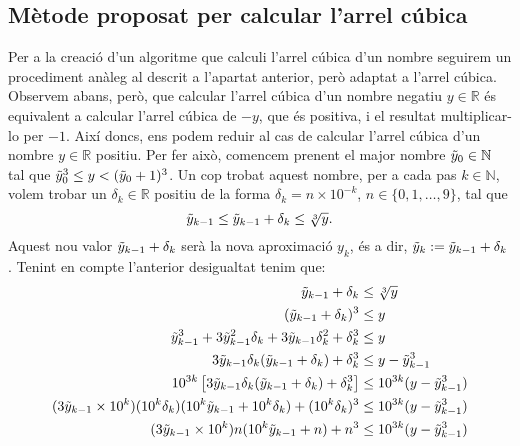 \documentclass[11pt,a4paper]{article}
\theoremstyle{definition}
\begin{document}
\subsection{Mètode proposat per calcular l'arrel cúbica}
Per a la creació d'un algoritme que calculi l'arrel cúbica d'un nombre seguirem un procediment anàleg al descrit a l'apartat anterior, però adaptat a l'arrel cúbica. Observem abans, però, que calcular l'arrel cúbica d'un nombre negatiu $y\in\mathbb{R}$ és equivalent a calcular l'arrel cúbica de $-y$, que és positiva, i el resultat multiplicar-lo per $-1$. Així doncs, ens podem reduir al cas de calcular l'arrel cúbica d'un nombre $y\in\mathbb{R}$ positiu. Per fer això, comencem prenent el major nombre $\Tilde{y}_0\in\mathbb{N}$ tal que $\Tilde{y}_0^3\leq y<(\Tilde{y}_0+1)^3$. Un cop trobat aquest nombre, per a cada pas $k\in\mathbb{N}$, volem trobar un $\delta_k\in\mathbb{R}$ positiu de la forma $\delta_k=n\times10^{-k}$, $n\in\{0,1,\ldots,9\}$, tal que $$\Tilde{y}_{k-1}\leq\Tilde{y}_{k-1}+\delta_k\leq\sqrt[3]{y}.$$ Aquest nou valor $\Tilde{y}_{k-1}+\delta_k$ serà la nova aproximació $y_k$, és a dir, $\Tilde{y}_k:=\Tilde{y}_{k-1}+\delta_k$. Tenint en compte l'anterior desigualtat tenim que:
\begin{align*}
    \Tilde{y}_{k-1}+\delta_k                                                                      & \leq\sqrt[3]{y}                   \\
    (\Tilde{y}_{k-1}+\delta_k)^3                                                                  & \leq y                            \\
    \Tilde{y}_{k-1}^3+3\Tilde{y}_{k-1}^2\delta_k+3\Tilde{y}_{k-1}\delta_k^2+\delta_k^3            & \leq y                            \\
    3\Tilde{y}_{k-1}\delta_k(\Tilde{y}_{k-1}+\delta_k)+\delta_k^3                                 & \leq y-\Tilde{y}_{k-1}^3          \\
    10^{3k}\left[3\Tilde{y}_{k-1}\delta_k(\Tilde{y}_{k-1}+\delta_k)+\delta_k^3\right]             & \leq 10^{3k}(y-\Tilde{y}_{k-1}^3) \\
    (3\Tilde{y}_{k-1}\times10^k)(10^k\delta_k)(10^k\Tilde{y}_{k-1}+10^k\delta_k)+(10^k\delta_k)^3 & \leq 10^{3k}(y-\Tilde{y}_{k-1}^3) \\
    (3\Tilde{y}_{k-1}\times10^k)n(10^k\Tilde{y}_{k-1}+n)+n^3                                      & \leq 10^{3k}(y-\Tilde{y}_{k-1}^3)
\end{align*}
\end{document}

